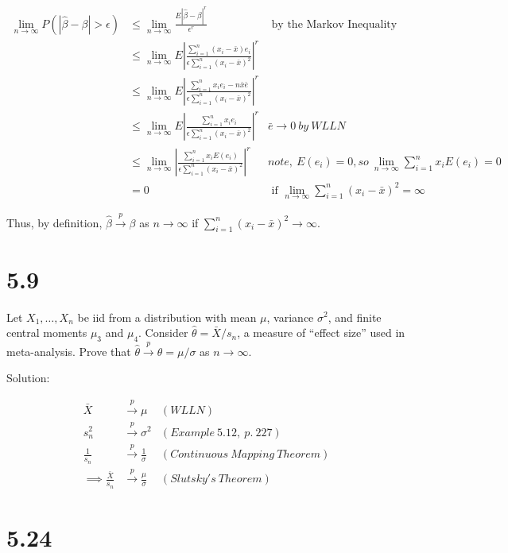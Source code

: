 \documentclass[
  letterpaper,
  DIV=11,
  numbers=noendperiod]{scrreprt}
\begin{document}
\[ \begin{aligned}
\lim_{n \to \infty} P(|\hat \beta - \beta| > \epsilon) &\leq \lim_{n \to \infty} \frac{E|\hat \beta - \beta|^r}{\epsilon^r} & \text{ by the Markov Inequality} \\
&\leq \lim_{n \to \infty} E \left|\frac{\sum_{i=1}^n (x_i-\bar x)e_i}{\epsilon \sum_{i=1}^n (x_i-\bar x)^2}\right|^r \\
&\leq \lim_{n \to \infty}E \left |\frac{\sum_{i=1}^n x_ie_i- n\bar x \bar e}{\epsilon \sum_{i=1}^n (x_i-\bar x)^2}\right|^r \\
&\leq \lim_{n \to \infty}E \left |\frac{\sum_{i=1}^n x_ie_i}{\epsilon \sum_{i=1}^n (x_i-\bar x)^2}\right|^r & \bar e \to 0 ~ by ~ WLLN\\
&\leq \lim_{n \to \infty}\left |\frac{\sum_{i=1}^n x_iE(e_i)}{\epsilon \sum_{i=1}^n (x_i-\bar x)^2}\right|^r & note,~E(e_i) =0, so~\lim_{n \to \infty}\sum_{i=1}^n x_iE(e_i)=0\\
&=0 & \text{ if } \lim_{n \to \infty} \sum_{i=1}^n (x_i-\bar x)^2= \infty
\end{aligned}\]

Thus, by definition, \(\hat \beta \overset p \to \beta\) as
\(n \to \infty\) if \(\sum_{i=1}^n(x_i-\bar x)^2 \to \infty\).

\hypertarget{section-30}{%
\section{5.9}\label{section-30}}

Let \(X_1, \dots, X_n\) be iid from a distribution with mean \(\mu\),
variance \(\sigma^2\), and finite central moments \(\mu_3\) and
\(\mu_4\). Consider \(\hat \theta = \bar X /s_n\), a measure of ``effect
size'' used in meta-analysis. Prove that
\(\hat \theta \overset p \to \theta = \mu/\sigma\) as \(n \to \infty\).

Solution:

\[ \begin{aligned}
\bar X  & \overset p \to \mu  & (WLLN) \\
s_n^2 & \overset p \to \sigma^2 & (Example~5.12,~p.~ 227) \\
\frac{1}{s_n} & \overset p \to \frac 1 \sigma & (Continuous~Mapping~Theorem) \\
\implies \frac{\bar X}{s_n} & \overset p \to \frac{\mu} \sigma & (Slutsky's~Theorem)
\end{aligned}\]

\newpage

\hypertarget{section-31}{%
\section{5.24}\label{section-31}}
\end{document}
